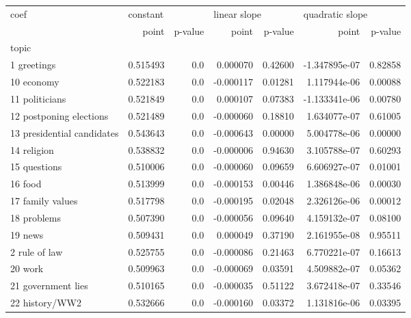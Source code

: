 \begin{tabular}{lrrrrrr}
\toprule
coef & \multicolumn{2}{l}{constant} & \multicolumn{2}{l}{linear slope} & \multicolumn{2}{l}{quadratic slope} \\
{} &     point & p-value &        point &  p-value &           point &  p-value \\
topic                      &           &         &              &          &                 &          \\
\midrule
1 greetings                &  0.515493 &     0.0 &     0.000070 &  0.42600 &   -1.347895e-07 &  0.82858 \\
10 economy                 &  0.522183 &     0.0 &    -0.000117 &  0.01281 &    1.117944e-06 &  0.00088 \\
11 politicians             &  0.521849 &     0.0 &     0.000107 &  0.07383 &   -1.133341e-06 &  0.00780 \\
12 postponing elections    &  0.521489 &     0.0 &    -0.000060 &  0.18810 &    1.634077e-07 &  0.61005 \\
13 presidential candidates &  0.543643 &     0.0 &    -0.000643 &  0.00000 &    5.004778e-06 &  0.00000 \\
14 religion                &  0.538832 &     0.0 &    -0.000006 &  0.94630 &    3.105788e-07 &  0.60293 \\
15 questions               &  0.510006 &     0.0 &    -0.000060 &  0.09659 &    6.606927e-07 &  0.01001 \\
16 food                    &  0.513999 &     0.0 &    -0.000153 &  0.00446 &    1.386848e-06 &  0.00030 \\
17 family values           &  0.517798 &     0.0 &    -0.000195 &  0.02048 &    2.326126e-06 &  0.00012 \\
18 problems                &  0.507390 &     0.0 &    -0.000056 &  0.09640 &    4.159132e-07 &  0.08100 \\
19 news                    &  0.509431 &     0.0 &     0.000049 &  0.37190 &    2.161955e-08 &  0.95511 \\
2 rule of law              &  0.525755 &     0.0 &    -0.000086 &  0.21463 &    6.770221e-07 &  0.16613 \\
20 work                    &  0.509963 &     0.0 &    -0.000069 &  0.03591 &    4.509882e-07 &  0.05362 \\
21 government lies         &  0.510165 &     0.0 &    -0.000035 &  0.51122 &    3.672418e-07 &  0.33546 \\
22 history/WW2             &  0.532666 &     0.0 &    -0.000160 &  0.03372 &    1.131816e-06 &  0.03395 \\

\end{tabular}
